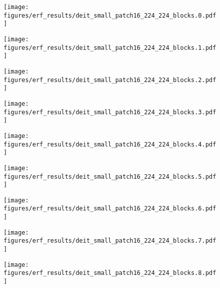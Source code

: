 \documentclass{article}
\begin{document}
\begin{figure}[tb]
  \raggedright
  \begin{minipage}[t]{0.13\hsize}
    \centering
    \texttt{[image: figures/erf\_results/deit\_small\_patch16\_224\_224\_blocks.0.pdf]}
    \label{figure:erf_deit:0}
  \end{minipage}
  \begin{minipage}[t]{0.13\hsize}
    \centering
    \texttt{[image: figures/erf\_results/deit\_small\_patch16\_224\_224\_blocks.1.pdf]}
    \label{figure:erf_deit:1}
  \end{minipage}
  \begin{minipage}[t]{0.13\hsize}
    \centering
    \texttt{[image: figures/erf\_results/deit\_small\_patch16\_224\_224\_blocks.2.pdf]}
    \label{figure:erf_deit:2}
  \end{minipage}
  \begin{minipage}[t]{0.13\hsize}
    \centering
    \texttt{[image: figures/erf\_results/deit\_small\_patch16\_224\_224\_blocks.3.pdf]}
    \label{figure:erf_deit:3}
  \end{minipage}
  \begin{minipage}[t]{0.13\hsize}
    \centering
    \texttt{[image: figures/erf\_results/deit\_small\_patch16\_224\_224\_blocks.4.pdf]}
    \label{figure:erf_deit:4}
  \end{minipage}
  \begin{minipage}[t]{0.13\hsize}
    \centering
    \texttt{[image: figures/erf\_results/deit\_small\_patch16\_224\_224\_blocks.5.pdf]}
    \label{figure:erf_deit:5}
  \end{minipage}
  \begin{minipage}[t]{0.13\hsize}
    \centering
    \texttt{[image: figures/erf\_results/deit\_small\_patch16\_224\_224\_blocks.6.pdf]}
    \label{figure:erf_deit:6}
  \end{minipage}
  \begin{minipage}[t]{0.13\hsize}
    \centering
    \texttt{[image: figures/erf\_results/deit\_small\_patch16\_224\_224\_blocks.7.pdf]}
    \label{figure:erf_deit:7}
  \end{minipage}
  \begin{minipage}[t]{0.13\hsize}
    \centering
    \texttt{[image: figures/erf\_results/deit\_small\_patch16\_224\_224\_blocks.8.pdf]}

\end{minipage}
\end{figure}
\end{document}
